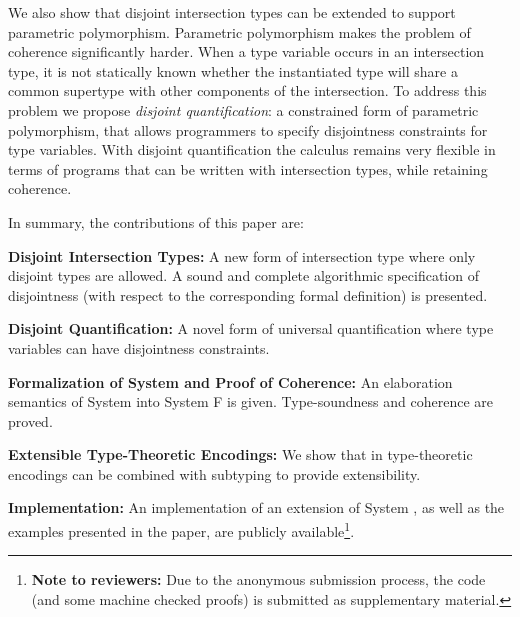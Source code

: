 We also show that disjoint intersection types can be extended to
support parametric polymorphism. Parametric polymorphism makes the
problem of coherence significantly harder. When a type variable occurs
in an intersection type, it is not statically known whether the
instantiated type will share a common supertype with other components
of the intersection. To address this problem we propose
\emph{disjoint quantification}: a constrained form of parametric
polymorphism, that allows programmers to specify disjointness
constraints for type variables. With disjoint quantification the
calculus remains very flexible in terms of programs that can be
written with intersection types, while retaining coherence.

In summary, the contributions of this paper are:

\begin{itemize*}

\item {\bf Disjoint Intersection Types:} A new form of intersection
  type where only disjoint types are allowed. A sound and complete
  algorithmic specification of disjointness (with respect to the
  corresponding formal definition) is presented.

\item {\bf Disjoint Quantification:} A novel form of universal
quantification where type variables can have disjointness
constraints.

\item {\bf Formalization of System \name and Proof of Coherence:} An
  elaboration semantics of System \name into System F is
  given. Type-soundness and coherence are proved.

\item {\bf Extensible Type-Theoretic Encodings:} We show that in \name
 type-theoretic encodings can be combined with subtyping to provide extensibility.

\item {\bf Implementation:} An implementation of an
  extension of System \name, as well as the examples presented in the
  paper, are publicly available\footnote{{\bf Note to reviewers:} Due
    to the anonymous submission process, the code (and some machine
    checked proofs) is submitted as supplementary material.}.

\end{itemize*}

